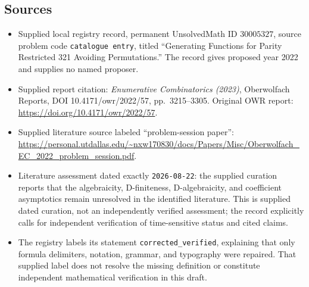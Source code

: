 \documentclass[11pt]{article}
\begin{document}
\subsection{Sources}
\begin{itemize}
\item Supplied local registry record, permanent UnsolvedMath ID \(30005327\), source problem code \texttt{catalogue entry}, titled ``Generating Functions for Parity Restricted 321 Avoiding Permutations.'' The record gives proposed year 2022 and supplies no named proposer.
\item Supplied report citation: \emph{Enumerative Combinatorics (2023)}, Oberwolfach Reports, DOI 10.4171/owr/2022/57, pp.\ 3215--3305. Original OWR report: \url{https://doi.org/10.4171/owr/2022/57}.
\item Supplied literature source labeled ``problem-session paper'': \url{https://personal.utdallas.edu/~nxw170830/docs/Papers/Misc/Oberwolfach_EC_2022_problem_session.pdf}.
\item Literature assessment dated exactly \texttt{2026-08-22}: the supplied curation reports that the algebraicity, D-finiteness, D-algebraicity, and coefficient asymptotics remain unresolved in the identified literature. This is supplied dated curation, not an independently verified assessment; the record explicitly calls for independent verification of time-sensitive status and cited claims.
\item The registry labels its statement \texttt{corrected\_verified}, explaining that only formula delimiters, notation, grammar, and typography were repaired. That supplied label does not resolve the missing definition or constitute independent mathematical verification in this draft.
\end{itemize}
\end{document}
